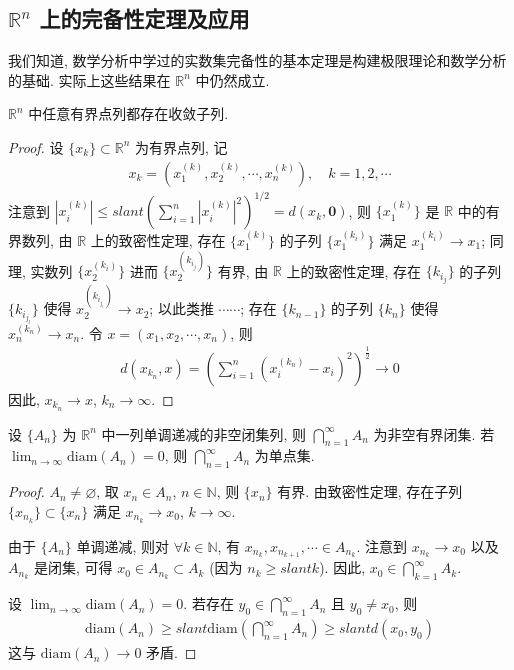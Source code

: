 \documentclass[../../main.tex]{subfiles}
\begin{document}
\subsection{$\mathbb{R}^n$ 上的完备性定理及应用}

我们知道, 数学分析中学过的实数集完备性的基本定理是构建极限理论和数学分析的基础. 实际上这些结果在 $\mathbb{R}^n$ 中仍然成立.

\begin{theorem}[致密性定理]\label{theorem:致密性定理}
$\mathbb{R}^n$ 中任意有界点列都存在收敛子列.
\end{theorem}
\begin{proof}
设 $\{x_k\} \subset \mathbb{R}^n$ 为有界点列, 记
\begin{align*}
x_k = (x_1^{(k)}, x_2^{(k)}, \cdots, x_n^{(k)}), \quad k = 1, 2, \cdots
\end{align*}
注意到 $|x_i^{(k)}| \leqslant slant \left(\sum_{i = 1}^{n}|x_i^{(k)}|^2\right)^{1/2} = d(x_k, \mathbf{0})$, 则 $\{x_1^{(k)}\}$ 是 $\mathbb{R}$ 中的有界数列, 由 $\mathbb{R}$ 上的致密性定理, 存在 $\{x_1^{(k)}\}$ 的子列 $\{x_1^{(k_i)}\}$ 满足 $x_1^{(k_i)} \to x_1$; 同理, 实数列 $\{x_2^{(k_i)}\}$ 进而 $\{x_2^{(k_{i_j})}\}$ 有界, 由 $\mathbb{R}$ 上的致密性定理, 存在 $\{k_{i_j}\}$ 的子列 $\{k_{i_{j_l}}\}$ 使得 $x_2^{(k_{i_{j_l}})} \to x_2$; 以此类推 $\cdots\cdots$; 存在 $\{k_{n - 1}\}$ 的子列 $\{k_n\}$ 使得 $x_n^{(k_n)} \to x_n$. 令 $x = (x_1, x_2, \cdots, x_n)$, 则
\begin{align*}
d(x_{k_n}, x) = \left(\sum_{i = 1}^{n}(x_i^{(k_n)} - x_i)^2\right)^{\frac{1}{2}} \to 0
\end{align*}
因此, $x_{k_n} \to x$, $k_n \to \infty$.
\end{proof}

\begin{theorem}[闭集套定理]\label{theorem:闭集套定理}
设 $\{A_n\}$ 为 $\mathbb{R}^n$ 中一列单调递减的非空闭集列, 则 $\bigcap_{n = 1}^{\infty} A_n$ 为非空有界闭集. 若 $\lim_{n \to \infty} \mathrm{diam}(A_n) = 0$, 则 $\bigcap_{n = 1}^{\infty} A_n$ 为单点集.
\end{theorem}
\begin{proof}
$A_n \neq \varnothing$, 取 $x_n \in A_n$, $n \in \mathbb{N}$, 则 $\{x_n\}$ 有界. 由致密性定理, 存在子列 $\{x_{n_k}\} \subset \{x_n\}$ 满足 $x_{n_k} \to x_0$, $k \to \infty$.

由于 $\{A_n\}$ 单调递减, 则对 $\forall k \in \mathbb{N}$, 有 $x_{n_k}, x_{n_{k + 1}}, \cdots \in A_{n_k}$. 注意到 $x_{n_k} \to x_0$ 以及 $A_{n_k}$ 是闭集, 可得 $x_0 \in A_{n_k} \subset A_k$ (因为 $n_k \geqslant slant k$). 因此, $x_0 \in \bigcap_{k = 1}^{\infty} A_k$.

设 $\lim_{n \to \infty} \mathrm{diam}(A_n) = 0$. 若存在 $y_0 \in \bigcap_{n = 1}^{\infty} A_n$ 且 $y_0 \neq x_0$, 则
\begin{align*}
\mathrm{diam}(A_n) \geqslant slant \mathrm{diam}\left(\bigcap_{n = 1}^{\infty} A_n\right) \geqslant slant d(x_0, y_0)
\end{align*}
这与 $\mathrm{diam}(A_n) \to 0$ 矛盾. 
\end{proof}
\end{document}
